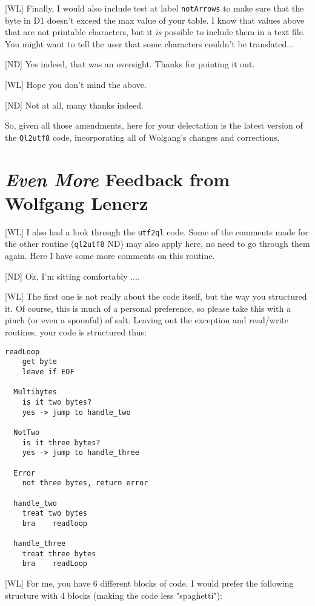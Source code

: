 [WL] Finally, I would also include  test at label \texttt{notArrows} to make sure that the byte in D1 doesn't exceed the max value of your table. I know that values above that are not printable characters, but it \emph{is} possible to include them in a text file. You might want to tell the user that some characters couldn't be translated...

[ND] Yes indeed, that was an oversight. Thanks for pointing it out.

[WL] Hope you don't mind the above.

[ND] Not at all, many thanks indeed.

So, given all those amendments, here for your delectation is the latest version of the \texttt{Ql2utf8} code, incorporating all of Wolgang's changes and corrections.


\section{\emph{Even More} Feedback from Wolfgang Lenerz}
	
[WL] I also had a look through the \texttt{utf2ql} code. Some of the comments made for the other routine (\texttt{ql2utf8} ND) may also apply here, no need to go through them again. Here I have some more comments on this routine.

[ND] Ok, I'm sitting comfortably ....
	
[WL] The first one is not really about the code itself, but the way you structured it. Of course, this is much of a personal preference, so please take this with a pinch (or even a spoonful) of salt. Leaving out the exception and read/write routines, your code is structured thus:
	
\begin{lstlisting}[numbers=none]
  readLoop
    get byte
    leave if EOF

  Multibytes
    is it two bytes?
    yes -> jump to handle_two
  
  NotTwo
    is it three bytes?
    yes -> jump to handle_three

  Error   
    not three bytes, return error

  handle_two   
    treat two bytes
    bra    readloop

  handle_three
    treat three bytes
    bra    readLoop
\end{lstlisting}
	
	
[WL] For me, you have 6 different blocks of code. I would prefer the following structure with 4 blocks (making the code less "spaghetti"):
	
